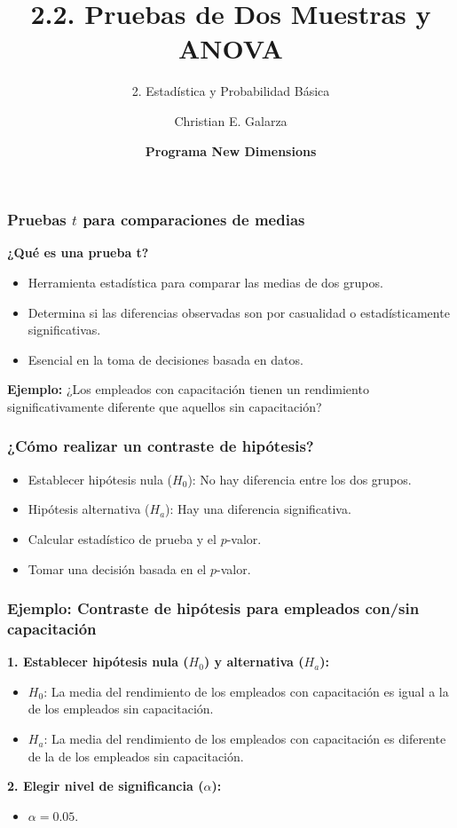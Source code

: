 \documentclass[aspectratio=169]{beamer}
\title[2.2. Pruebas de Dos Muestras y ANOVA]{\Huge 2.2. Pruebas de Dos Muestras y ANOVA}
\subtitle{2. Estadística y Probabilidad Básica}
\author{Christian E. Galarza}
\date{\bf Programa New Dimensions}
\begin{document}
\frame{\titlepage}

\begin{frame}
    \frametitle{Pruebas $t$ para comparaciones de medias}
    \textbf{¿Qué es una prueba t?}
    \begin{itemize}
        \item Herramienta estadística para comparar las medias de dos grupos.
        \item Determina si las diferencias observadas son por casualidad o estadísticamente significativas.
        \item Esencial en la toma de decisiones basada en datos.
    \end{itemize}

\vfill
    
    \textbf{Ejemplo:} ¿Los empleados con capacitación tienen un rendimiento significativamente diferente que aquellos sin capacitación?
\end{frame}

\begin{frame}
    \frametitle{¿Cómo realizar un contraste de hipótesis?}
    \begin{itemize}
        \item Establecer hipótesis nula (\(H_0\)): No hay diferencia entre los dos grupos.
        \item Hipótesis alternativa (\(H_a\)): Hay una diferencia significativa.
        
        \item Calcular estadístico de prueba y el $p$-valor.
        \item Tomar una decisión basada en el $p$-valor.
    \end{itemize}

\end{frame}



\begin{frame}
    \frametitle{Ejemplo: Contraste de hipótesis para empleados con/sin capacitación}
    
    \textbf{1. Establecer hipótesis nula (\(H_0\)) y alternativa (\(H_a\)):}
    \begin{itemize}
        \item \(H_0\): La media del rendimiento de los empleados con capacitación es igual a la de los empleados sin capacitación.
        \item \(H_a\): La media del rendimiento de los empleados con capacitación es diferente de la de los empleados sin capacitación.
    \end{itemize}
    
    \textbf{2. Elegir nivel de significancia (\(\alpha\)):}
    \begin{itemize}
        \item \(\alpha = 0.05\).
    \end{itemize}

\end{frame}
\end{document}
